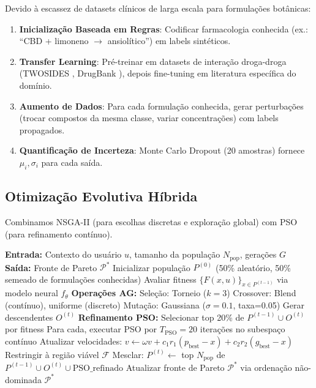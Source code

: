 \documentclass[11pt,a4paper]{article}
\begin{document}
Devido à escassez de datasets clínicos de larga escala para formulações botânicas:
\begin{enumerate}
    \item \textbf{Inicialização Baseada em Regras}: Codificar farmacologia conhecida (ex.: ``CBD + limoneno \(\to\) ansiolítico'') em labels sintéticos.
    \item \textbf{Transfer Learning}: Pré-treinar em datasets de interação droga-droga (TWOSIDES \cite{Tatonetti2012}, DrugBank \cite{Wishart2018}), depois fine-tuning em literatura específica do domínio.
    \item \textbf{Aumento de Dados}: Para cada formulação conhecida, gerar perturbações (trocar compostos da mesma classe, variar concentrações) com labels propagados.
    \item \textbf{Quantificação de Incerteza}: Monte Carlo Dropout (20 amostras) fornece \(\mu_i, \sigma_i\) para cada saída.
\end{enumerate}

\subsection{Otimização Evolutiva Híbrida}

Combinamos NSGA-II (para escolhas discretas e exploração global) com PSO (para refinamento contínuo).

\begin{algorithm}
\caption{NSGA-II + PSO Híbrido}
\begin{algorithmic}[1]
\State \textbf{Entrada:} Contexto do usuário $u$, tamanho da população $N_{\text{pop}}$, gerações $G$
\State \textbf{Saída:} Fronte de Pareto $\mathcal{P}^*$
\State Inicializar população $P^{(0)}$ (50\% aleatório, 50\% semeado de formulações conhecidas)
    \State Avaliar fitness $\{F(x, u)\}_{x \in P^{(t-1)}}$ via modelo neural $f_\theta$
    \State \textbf{Operações AG:}
    \State \quad Seleção: Torneio ($k=3$)
    \State \quad Crossover: Blend (contínuo), uniforme (discreto)
    \State \quad Mutação: Gaussiana ($\sigma=0.1$, taxa=0.05)
    \State \quad Gerar descendentes $O^{(t)}$
    \State \textbf{Refinamento PSO:}
    \State \quad Selecionar top 20\% de $P^{(t-1)} \cup O^{(t)}$ por fitness
    \State \quad Para cada, executar PSO por $T_{\text{PSO}}=20$ iterações no subespaço contínuo
    \State \quad Atualizar velocidades: $v \leftarrow \omega v + c_1 r_1 (p_{\text{best}} - x) + c_2 r_2 (g_{\text{best}} - x)$
    \State \quad Restringir à região viável $\mathcal{F}$
    \State Mesclar: $P^{(t)} \leftarrow$ top $N_{\text{pop}}$ de $P^{(t-1)} \cup O^{(t)} \cup \text{PSO\_refinado}$
    \State Atualizar fronte de Pareto $\mathcal{P}^*$ via ordenação não-dominada
\EndFor
\State \Return $\mathcal{P}^*$
\end{algorithmic}
\end{algorithm}
\end{document}
